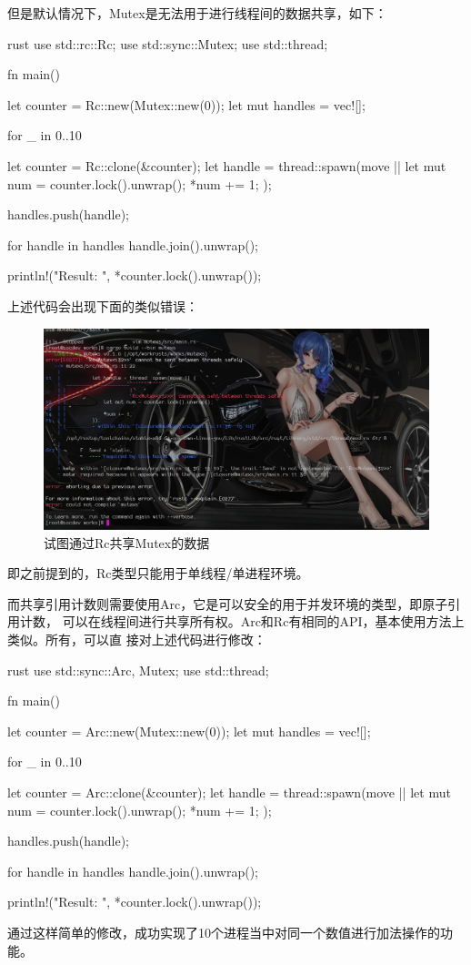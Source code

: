 但是默认情况下，Mutex是无法用于进行线程间的数据共享，如下：
\begin{code-block}{rust}
use std::rc::Rc;
use std::sync::Mutex;
use std::thread;

fn main() {
    let counter = Rc::new(Mutex::new(0));
    let mut handles = vec![];

    for _ in 0..10 {
        let counter = Rc::clone(&counter);
        let handle = thread::spawn(move || {
            let mut num = counter.lock().unwrap();
            *num += 1;
        });

        handles.push(handle);
    }

    for handle in handles {
        handle.join().unwrap();
    }

    println!("Result: {}", *counter.lock().unwrap());
}
\end{code-block}
上述代码会出现下面的类似错误：
\begin{figure}[H]
  \centering
  \includegraphics[width=\linewidth]{rust_mutex_share_error.png}
  \caption{试图通过Rc共享Mutex的数据}
  \label{fig:rust_mutex_share_error}
\end{figure}
即之前提到的，Rc类型只能用于单线程/单进程环境。

而共享引用计数则需要使用Arc，它是可以安全的用于并发环境的类型，即原子引用计数，
可以在线程间进行共享所有权。Arc和Rc有相同的API，基本使用方法上类似。所有，可以直
接对上述代码进行修改：
\begin{code-block}{rust}
use std::sync::{Arc, Mutex};
use std::thread;

fn main() {
    let counter = Arc::new(Mutex::new(0));
    let mut handles = vec![];

    for _ in 0..10 {
        let counter = Arc::clone(&counter);
        let handle = thread::spawn(move || {
            let mut num = counter.lock().unwrap();
            *num += 1;
        });

        handles.push(handle);
    }

    for handle in handles {
        handle.join().unwrap();
    }

    println!("Result: {}", *counter.lock().unwrap());
}
\end{code-block}
通过这样简单的修改，成功实现了10个进程当中对同一个数值进行加法操作的功能。

